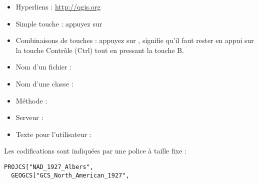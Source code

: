 \begin{itemize}
%
\item Hyperliens : \url{http://qgis.org}
\item Simple touche : appuyez sur 
\item Combinaisons de touches : appuyez sur , signifie qu'il faut rester en appui sur la touche Contrôle (Ctrl) tout en pressant la touche B.
\item Nom d'un fichier : 
\item Nom d'une classe : 
\item Méthode : 
\item Serveur : 
%
\item Texte pour l'utilisateur : 
\end{itemize}

Les codifications sont indiquées par une police à taille fixe :
\begin{verbatim}
PROJCS["NAD_1927_Albers",
  GEOGCS["GCS_North_American_1927",
\end{verbatim}

% 

